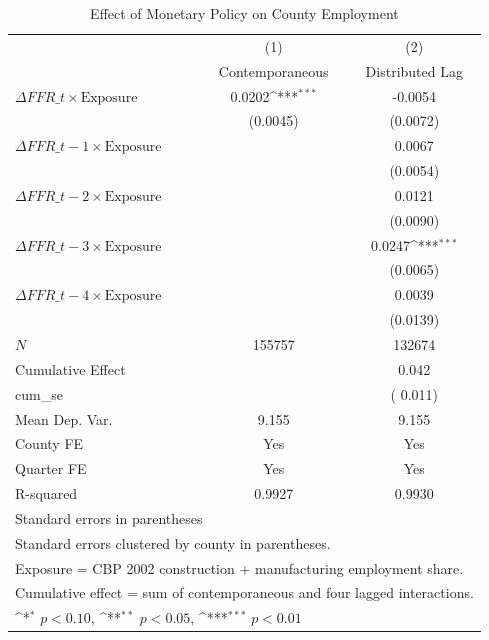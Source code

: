 \begin{table}[htbp]\centering
\def\sym#1{\ifmmode^{#1}\else\(^{#1}\)\fi}
\caption{Effect of Monetary Policy on County Employment}
\begin{tabular}{l*{2}{c}}
\toprule
            &\multicolumn{1}{c}{(1)}&\multicolumn{1}{c}{(2)}\\
            &\multicolumn{1}{c}{Contemporaneous}&\multicolumn{1}{c}{Distributed Lag}\\
\midrule
$\Delta FFR\_t \times \text{Exposure}$&      0.0202\sym{***}&     -0.0054         \\
            &    (0.0045)         &    (0.0072)         \\
\addlinespace
$\Delta FFR\_{t-1} \times \text{Exposure}$&                     &      0.0067         \\
            &                     &    (0.0054)         \\
\addlinespace
$\Delta FFR\_{t-2} \times \text{Exposure}$&                     &      0.0121         \\
            &                     &    (0.0090)         \\
\addlinespace
$\Delta FFR\_{t-3} \times \text{Exposure}$&                     &      0.0247\sym{***}\\
            &                     &    (0.0065)         \\
\addlinespace
$\Delta FFR\_{t-4} \times \text{Exposure}$&                     &      0.0039         \\
            &                     &    (0.0139)         \\
\midrule
\(N\)       &      155757         &      132674         \\
Cumulative Effect&                     &       0.042         \\
cum\_se      &                     & (    0.011)         \\
Mean Dep. Var.&       9.155         &       9.155         \\
County FE   &         Yes         &         Yes         \\
Quarter FE  &         Yes         &         Yes         \\
R-squared   &      0.9927         &      0.9930         \\
\bottomrule
\multicolumn{3}{l}{\footnotesize Standard errors in parentheses}\\
\multicolumn{3}{l}{\footnotesize Standard errors clustered by county in parentheses.}\\
\multicolumn{3}{l}{\footnotesize Exposure = CBP 2002 construction + manufacturing employment share.}\\
\multicolumn{3}{l}{\footnotesize Cumulative effect = sum of contemporaneous and four lagged interactions.}\\
\multicolumn{3}{l}{\footnotesize \sym{*} \(p<0.10\), \sym{**} \(p<0.05\), \sym{***} \(p<0.01\)}\\
\end{tabular}
\end{table}
